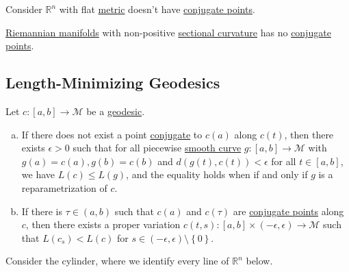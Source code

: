 \begin{eg}
	Consider \(\mathbb{R} ^n\) with flat \hyperref[def:Riemannian-metric]{metric} doesn't have \hyperref[def:conjugate-point]{conjugate points}.
\end{eg}

\begin{eg}
	\hyperref[def:Riemannian-manifold]{Riemannian manifolds} with non-positive \hyperref[def:sectional-curvature]{sectional curvature} has no \hyperref[def:conjugate-point]{conjugate points}.
\end{eg}

\subsection{Length-Minimizing Geodesics}

\begin{theorem}\label{thm:lec18-2}
	Let \(c\colon [a, b] \to \mathcal{M} \) be a \hyperref[def:geodesic]{geodesic}.
	\begin{enumerate}[(a)]
		\item If there does not exist a point \hyperref[def:conjugate-point]{conjugate} to \(c(a)\) along \(c(t)\), then there exists \(\epsilon > 0\) such that for all piecewise \hyperref[def:curve]{smooth curve} \(g\colon [a, b] \to \mathcal{M} \) with \(g(a) = c(a), g(b) = c(b)\) and \(d(g(t), c(t)) < \epsilon \) for all \(t\in [a, b]\), we have \(L(c) \leq L(g)\), and the equality holds when if and only if \(g\) is a reparametrization of \(c\).
		\item If there is \(\tau \in (a, b)\) such that \(c(a)\) and \(c(\tau )\) are \hyperref[def:conjugate-point]{conjugate points} along \(c\), then there exists a proper variation \(c(t, s) \colon [a, b] \times (-\epsilon , \epsilon ) \to \mathcal{M} \) such that \(L(c_s) < L(c)\) for \(s \in (-\epsilon , \epsilon ) \setminus \left\{ 0 \right\} \).
	\end{enumerate}
\end{theorem}

\begin{remark}
	Consider the cylinder, where we identify every line of \(\mathbb{R} ^n\) below.
	\begin{center}
	\end{center}
\end{remark}

